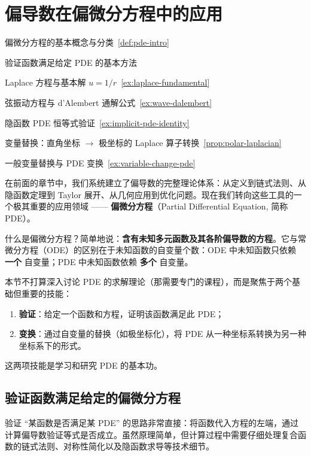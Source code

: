 \documentclass[lang=cn,11pt]{elegantbook}
\begin{document}
\section{偏导数在偏微分方程中的应用}

\begin{introduction}
  \item 偏微分方程的基本概念与分类~\ref{def:pde-intro}
  \item 验证函数满足给定 PDE 的基本方法
  \item Laplace 方程与基本解 $u=1/r$~\ref{ex:laplace-fundamental}
  \item 弦振动方程与 d'Alembert 通解公式~\ref{ex:wave-dalembert}
  \item 隐函数 PDE 恒等式验证~\ref{ex:implicit-pde-identity}
  \item 变量替换：直角坐标 $\to$ 极坐标的 Laplace 算子转换~\ref{prop:polar-laplacian}
  \item 一般变量替换与 PDE 变换~\ref{ex:variable-change-pde}
\end{introduction}

在前面的章节中，我们系统建立了偏导数的完整理论体系：从定义到链式法则、从隐函数定理到 Taylor 展开、从几何应用到优化问题。现在我们转向这些工具的一个极其重要的应用领域 —— \textbf{偏微分方程}（Partial Differential Equation, 简称 PDE）。

什么是偏微分方程？简单地说：\textbf{含有未知多元函数及其各阶偏导数的方程}。它与常微分方程（ODE）的区别在于未知函数的自变量个数：ODE 中未知函数只依赖 \textbf{一个} 自变量；PDE 中未知函数依赖 \textbf{多个} 自变量。

本节不打算深入讨论 PDE 的求解理论（那需要专门的课程），而是聚焦于两个基础但重要的技能：

\begin{enumerate}
  \item \textbf{验证}：给定一个函数和方程，证明该函数满足此 PDE；
  \item \textbf{变换}：通过自变量的替换（如极坐标化），将 PDE 从一种坐标系转换为另一种坐标系下的形式。
\end{enumerate}

这两项技能是学习和研究 PDE 的基本功。

\subsection{验证函数满足给定的偏微分方程}

验证 ``某函数是否满足某 PDE'' 的思路非常直接：将函数代入方程的左端，通过计算偏导数验证等式是否成立。虽然原理简单，但计算过程中需要仔细处理复合函数的链式法则、对称性简化以及隐函数求导等技术细节。
\end{document}

